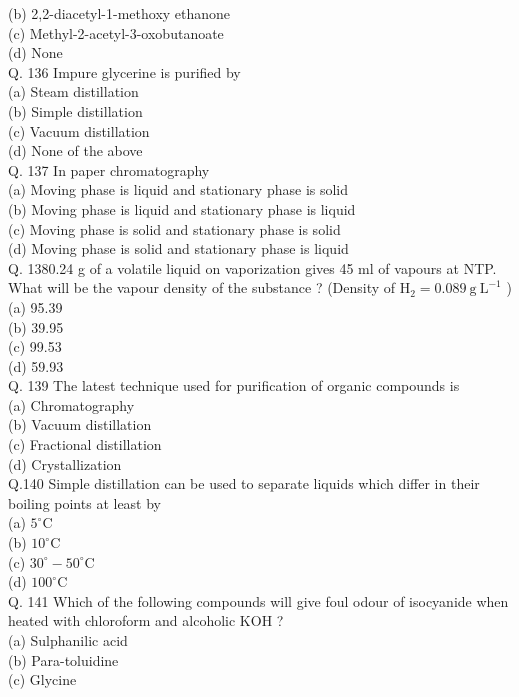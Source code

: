 \documentclass[10pt]{article}
\begin{document}
(b) 2,2-diacetyl-1-methoxy ethanone\\
(c) Methyl-2-acetyl-3-oxobutanoate\\
(d) None\\
Q. 136 Impure glycerine is purified by\\
(a) Steam distillation\\
(b) Simple distillation\\
(c) Vacuum distillation\\
(d) None of the above\\
Q. 137 In paper chromatography\\
(a) Moving phase is liquid and stationary phase is solid\\
(b) Moving phase is liquid and stationary phase is liquid\\
(c) Moving phase is solid and stationary phase is solid\\
(d) Moving phase is solid and stationary phase is liquid\\
Q. 1380.24 g of a volatile liquid on vaporization gives 45 ml of vapours at NTP. What will be the vapour density of the substance ? (Density of $\mathrm{H}_{2}=0.089 \mathrm{~g} \mathrm{~L}^{-1}$ )\\
(a) 95.39\\
(b) 39.95\\
(c) 99.53\\
(d) 59.93\\
Q. 139 The latest technique used for purification of organic compounds is\\
(a) Chromatography\\
(b) Vacuum distillation\\
(c) Fractional distillation\\
(d) Crystallization\\
Q.140 Simple distillation can be used to separate liquids which differ in their boiling points at least by\\
(a) $5^{\circ} \mathrm{C}$\\
(b) $10^{\circ} \mathrm{C}$\\
(c) $30^{\circ}-50^{\circ} \mathrm{C}$\\
(d) $100^{\circ} \mathrm{C}$\\
Q. 141 Which of the following compounds will give foul odour of isocyanide when heated with chloroform and alcoholic KOH ?\\
(a) Sulphanilic acid\\
(b) Para-toluidine\\
(c) Glycine\\
\end{document}
